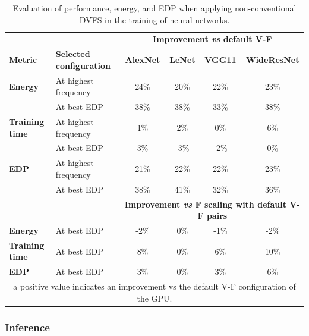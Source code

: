 \begin{table}[htbp]
    \centering
    \label{tab:trainingMetricsResults}
    \begin{tabular}{llcccc}
        &  &  \multicolumn{4}{c}{\textbf{Improvement {\it vs} default V-F}} \\ 
        \cline{3-6} 
        \bf Metric &  \bf Selected configuration &    \textbf{AlexNet} &  \textbf{LeNet} &  \textbf{VGG11} &  \textbf{WideResNet} \\ \hline
        \textbf{Energy}        & At highest frequency & 24\% & 20\% & 22\% & 23\% \\
        \textbf{}              & At best EDP          & 38\% & 38\% & 33\% & 38\% \\\hline
        \textbf{Training time} & At highest frequency & 1\%  & 2\%  & 0\%  & 6\%  \\
        \textbf{}              & At best EDP          & 3\%  & -3\% & -2\% & 0\% \\\hline
        \textbf{EDP}           & At highest frequency & 21\% & 22\% & 22\% & 23\% \\
        \textbf{}              & At best EDP          & 38\% & 41\% & 32\% & 36\% \\ \hline
        
        &  &\multicolumn{4}{c}{\textbf{Improvement {\it vs} F scaling with default V-F pairs}} \\ \hline
        \textbf{Energy}        &At best EDP&  -2\% & 0\% & -1\% & -2\% \\\hline
        \textbf{Training time} &At best EDP&  8\%  & 0\%  & 6\%  & 10\%  \\\hline
        \textbf{EDP}           &At best EDP&  3\% & 0\% & 3\% & 6\% \\ \hline
        \multicolumn{6}{c}{a positive value indicates an improvement vs the default V-F configuration of the GPU.} \\
    \end{tabular}%
    \caption{Evaluation of performance, energy, and EDP when applying non-conventional DVFS in the training of neural networks.}
\end{table}

\newpage

\subsubsection{Inference}

